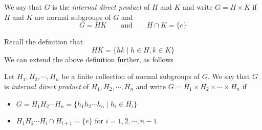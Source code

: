 \begin{definition}
	We say that $G$ is the \textit{internal direct product} of $H$ and $K$ and write $G=H\times K$ if $H$ and $K$ are normal subgroups of $G$ and 
	$$
	G = HK \qquad \text{and} \qquad H\cap K=\{e\}
	$$
\end{definition}
Recall the definition that 
$$
HK = \{hk\mid h\in H, k\in K\}
$$
We can extend the above definition further, as follows
\begin{definition}
	Let $H_1,H_2,\cdots,H_n$ be a finite collection of normal subgroups of $G$. We say that $G$ is \textit{internal direct product} of $H_1,H_2,\cdots,H_n$ and write $G=H_1\times H_2\times\cdots\times H_n$ if 
	\begin{itemize}
		\item $G = H_1H_2\cdots H_n = \{h_1h_2\cdots h_n\mid h_i\in H_i\}$
		\item $H_1H_2\cdots H_i\cap H_{i+1} = \{e\}$ for $i=1,2,\cdots,n-1$.
	\end{itemize}
\end{definition}

